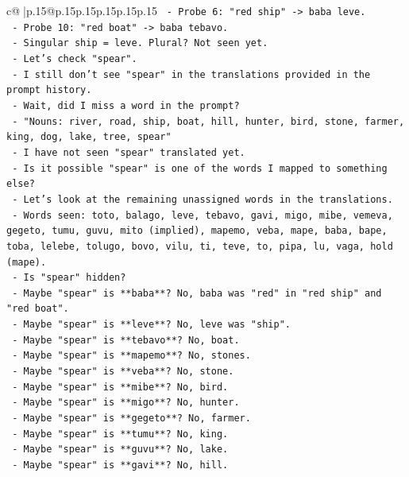 \documentclass{article}
\begin{document}
{\begin{supertabular}{c@{$\;$}|p{.15\linewidth}@{}p{.15\linewidth}p{.15\linewidth}p{.15\linewidth}p{.15\linewidth}p{.15\linewidth}}
{{{\texttt{    {-} Probe 6: "red ship" {-}> baba leve.} \\
\texttt{    {-} Probe 10: "red boat" {-}> baba tebavo.} \\
\texttt{    {-} Singular ship = leve. Plural? Not seen yet.} \\
\texttt{    {-} Let's check "spear".} \\
\texttt{    {-} I still don't see "spear" in the translations provided in the prompt history.} \\
\texttt{    {-} Wait, did I miss a word in the prompt?} \\
\texttt{    {-} "Nouns: river, road, ship, boat, hill, hunter, bird, stone, farmer, king, dog, lake, tree, spear"} \\
\texttt{    {-} I have not seen "spear" translated yet.} \\
\texttt{    {-} Is it possible "spear" is one of the words I mapped to something else?} \\
\texttt{    {-} Let's look at the remaining unassigned words in the translations.} \\
\texttt{    {-} Words seen: toto, balago, leve, tebavo, gavi, migo, mibe, vemeva, gegeto, tumu, guvu, mito (implied), mapemo, veba, mape, baba, bape, toba, lelebe, tolugo, bovo, vilu, ti, teve, to, pipa, lu, vaga, hold (mape).} \\
\texttt{    {-} Is "spear" hidden?} \\
\texttt{    {-} Maybe "spear" is **baba**? No, baba was "red" in "red ship" and "red boat".} \\
\texttt{    {-} Maybe "spear" is **leve**? No, leve was "ship".} \\
\texttt{    {-} Maybe "spear" is **tebavo**? No, boat.} \\
\texttt{    {-} Maybe "spear" is **mapemo**? No, stones.} \\
\texttt{    {-} Maybe "spear" is **veba**? No, stone.} \\
\texttt{    {-} Maybe "spear" is **mibe**? No, bird.} \\
\texttt{    {-} Maybe "spear" is **migo**? No, hunter.} \\
\texttt{    {-} Maybe "spear" is **gegeto**? No, farmer.} \\
\texttt{    {-} Maybe "spear" is **tumu**? No, king.} \\
\texttt{    {-} Maybe "spear" is **guvu**? No, lake.} \\
\texttt{    {-} Maybe "spear" is **gavi**? No, hill.} \\
}}}
\end{supertabular}}
\end{document}
